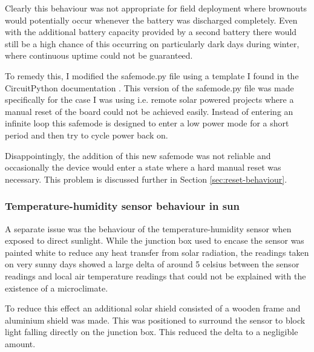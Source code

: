Clearly this behaviour was not appropriate for field deployment where brownouts
would potentially occur whenever the battery was discharged completely. Even
with the additional battery capacity provided by a second battery there would
still be a high chance of this occurring on particularly dark days during
winter, where continuous uptime could not be guaranteed.

To remedy this, I modified the safemode.py file using a template I found in the
CircuitPython documentation \cite{halbert2023safemode}. This version of the
safemode.py file was made specifically for the case I was using i.e. remote
solar powered projects where a manual reset of the board could not be achieved
easily. Instead of entering an infinite loop this safemode is designed to enter
a low power mode for a short period and then try to cycle power back on.

Disappointingly, the addition of this new safemode was not reliable and
occasionally the device would enter a state where a hard manual reset was
necessary. This problem is discussed further in Section
\ref{sec:reset-behaviour}.

\subsubsection{Temperature-humidity sensor behaviour in sun}

A separate issue was the behaviour of the temperature-humidity sensor when
exposed to direct sunlight. While the junction box used to encase the sensor was
painted white to reduce any heat transfer from solar radiation, the readings
taken on very sunny days showed a large delta of around 5 celsius between the
sensor readings and local air temperature readings that could not be explained
with the existence of a microclimate.

To reduce this effect an additional solar shield consisted of a wooden frame and
aluminium shield was made. This was positioned to surround the sensor to
block light falling directly on the junction box. This reduced the delta to a
negligible amount.
